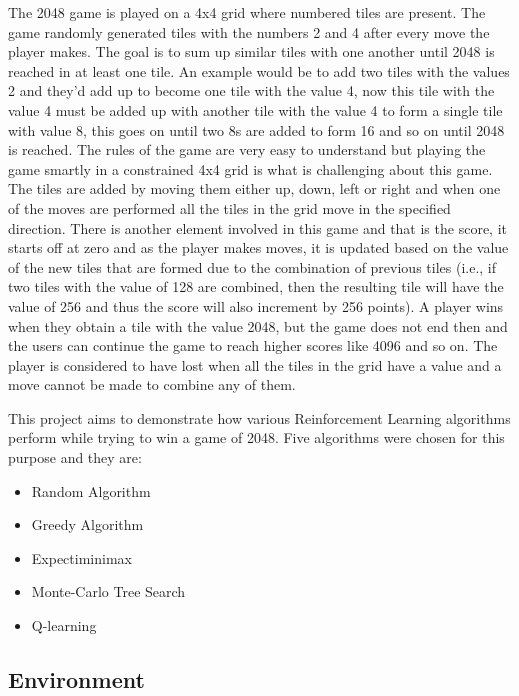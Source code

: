 \documentclass{svproc}
\begin{document}
	The 2048 game is played on a 4x4 grid where numbered tiles are present. The game randomly generated tiles with the numbers 2 and 4 after every move the player makes. The goal is to sum up similar tiles with one another until 2048 is reached in at least one tile. An example would be to add two tiles with the values 2 and they’d add up to become one tile with the value 4, now this tile with the value 4 must be added up with another tile with the value 4 to form a single tile with value 8, this goes on until two 8s are added to form 16 and so on until 2048 is reached. The rules of the game are very easy to understand but playing the game smartly in a constrained 4x4 grid is what is challenging about this game. The tiles are added by moving them either up, down, left or right and when one of the moves are performed all the tiles in the grid move in the specified direction. There is another element involved in this game and that is the score, it starts off at zero and as the player makes moves, it is updated based on the value of the new tiles that are formed due to the combination of previous tiles (i.e., if two tiles with the value of 128 are combined, then the resulting tile will have the value of 256 and thus the score will also increment by 256 points). A player wins when they obtain a tile with the value 2048, but the game does not end then and the users can continue the game to reach higher scores like 4096 and so on. The player is considered to have lost when all the tiles in the grid have a value and a move cannot be made to combine any of them.

	This project aims to demonstrate how various Reinforcement Learning algorithms perform while trying to win a game of 2048. Five algorithms were chosen for this purpose and they are:

	\begin{itemize}

		\item Random Algorithm
		\item Greedy Algorithm
		\item Expectiminimax  
		\item Monte-Carlo Tree Search 
		\item Q-learning

	\end{itemize}
    

    \subsection{Environment}
    
\end{document}
